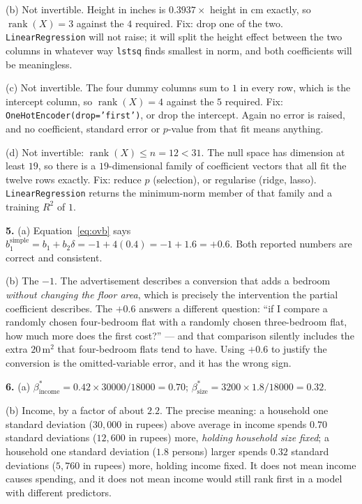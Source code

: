 \documentclass[11pt]{article}
\begin{document}
(b) Not invertible. Height in inches is $0.3937\times$ height in cm exactly,
so $\operatorname{rank}(X) = 3$ against the $4$ required. Fix: drop one of the
two. \texttt{LinearRegression} will not raise; it will split the height effect
between the two columns in whatever way \texttt{lstsq} finds smallest in norm,
and both coefficients will be meaningless.

(c) Not invertible. The four dummy columns sum to $1$ in every row, which is
the intercept column, so $\operatorname{rank}(X) = 4$ against the $5$
required. Fix: \texttt{OneHotEncoder(drop='first')}, or drop the intercept.
Again no error is raised, and no coefficient, standard error or $p$-value from
that fit means anything.

(d) Not invertible: $\operatorname{rank}(X) \le n = 12 < 31$. The null space
has dimension at least $19$, so there is a $19$-dimensional family of
coefficient vectors that all fit the twelve rows exactly. Fix: reduce $p$
(selection), or regularise (ridge, lasso). \texttt{LinearRegression} returns
the minimum-norm member of that family and a training $R^2$ of $1$.

\medskip
\textbf{5.} (a) Equation~\eqref{eq:ovb} says
$b_1^{\text{simple}} = b_1 + b_2\delta = -1 + 4(0.4) = -1 + 1.6 = +0.6$.
Both reported numbers are correct and consistent.

(b) The $-1$. The advertisement describes a conversion that adds a bedroom
\emph{without changing the floor area}, which is precisely the intervention
the partial coefficient describes. The $+0.6$ answers a different question:
``if I compare a randomly chosen four-bedroom flat with a randomly chosen
three-bedroom flat, how much more does the first cost?'' --- and that
comparison silently includes the extra $20\,\mathrm{m}^2$ that four-bedroom
flats tend to have. Using $+0.6$ to justify the conversion is the
omitted-variable error, and it has the wrong sign.

\medskip
\textbf{6.} (a) $\beta^*_{\text{income}} = 0.42 \times 30000/18000 = 0.70$;
$\beta^*_{\text{size}} = 3200 \times 1.8/18000 = 0.32$.

(b) Income, by a factor of about $2.2$. The precise meaning: a household one
standard deviation ($30{,}000$ in rupees) above average in income spends
$0.70$ standard deviations ($12{,}600$ in rupees) more, \emph{holding
household size fixed}; a household one standard deviation ($1.8$ persons)
larger spends $0.32$ standard deviations ($5{,}760$ in rupees) more, holding
income fixed. It does not mean income causes spending, and it does not mean
income would still rank first in a model with different predictors.
\end{document}
